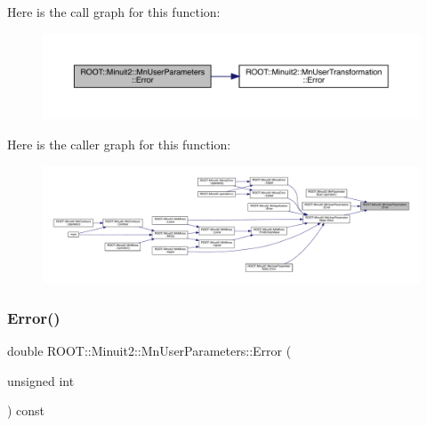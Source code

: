 Here is the call graph for this function\+:\nopagebreak
\begin{figure}[H]
\begin{center}
\leavevmode
\includegraphics[width=350pt]{d6/d10/classROOT_1_1Minuit2_1_1MnUserParameters_a08122c2515f2f3505ae14a26f7112dcc_cgraph}
\end{center}
\end{figure}
Here is the caller graph for this function\+:\nopagebreak
\begin{figure}[H]
\begin{center}
\leavevmode
\includegraphics[width=350pt]{d6/d10/classROOT_1_1Minuit2_1_1MnUserParameters_a08122c2515f2f3505ae14a26f7112dcc_icgraph}
\end{center}
\end{figure}
\mbox{\label{classROOT_1_1Minuit2_1_1MnUserParameters_a08122c2515f2f3505ae14a26f7112dcc}} 
\subsubsection{\texorpdfstring{Error()}{Error()}\hspace{0.1cm}{\footnotesize\ttfamily [2/4]}}
{\footnotesize\ttfamily double R\+O\+O\+T\+::\+Minuit2\+::\+Mn\+User\+Parameters\+::\+Error (\begin{DoxyParamCaption}\item[{unsigned int}]{ }\end{DoxyParamCaption}) const}

\mbox{\label{classROOT_1_1Minuit2_1_1MnUserParameters_a52dd385b551b309d26d0dc30581c0b56}} 
